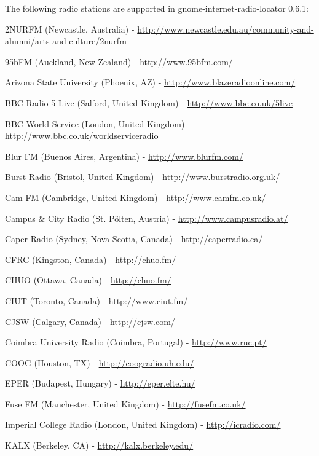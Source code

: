 \documentclass[20pt,landscape]{foils}
\begin{document}

The following radio stations are supported in gnome-internet-radio-locator 0.6.1:

\begin{list1}
\item
  \begin{list2}
  \item 2NURFM (Newcastle, Australia) - \url{http://www.newcastle.edu.au/community-and-alumni/arts-and-culture/2nurfm}
  \item 95bFM (Auckland, New Zealand) - \url{http://www.95bfm.com/}
  \item Arizona State University (Phoenix, AZ) - \url{http://www.blazeradioonline.com/}
  \item BBC Radio 5 Live (Salford, United Kingdom) - \url{http://www.bbc.co.uk/5live}
  \item BBC World Service (London, United Kingdom) - \url{http://www.bbc.co.uk/worldserviceradio}
  \item Blur FM (Buenos Aires, Argentina) - \url{http://www.blurfm.com/}
  \item Burst Radio (Bristol, United Kingdom) - \url{http://www.burstradio.org.uk/}
  \item Cam FM (Cambridge, United Kingdom) - \url{http://www.camfm.co.uk/}
  \item Campus \& City Radio (St. Pölten, Austria) - \url{http://www.campusradio.at/}
  \item Caper Radio (Sydney, Nova Scotia, Canada) - \url{http://caperradio.ca/}
  \item CFRC (Kingston, Canada) - \url{http://chuo.fm/}
  \item CHUO (Ottawa, Canada) - \url{http://chuo.fm/}
  \item CIUT (Toronto, Canada) - \url{http://www.ciut.fm/}
  \item CJSW (Calgary, Canada) - \url{http://cjsw.com/}
  \item Coimbra University Radio (Coimbra, Portugal) - \url{http://www.ruc.pt/}
  \item COOG (Houston, TX) - \url{http://coogradio.uh.edu/}
  \item EPER (Budapest, Hungary) - \url{http://eper.elte.hu/}
  \item Fuse FM (Manchester, United Kingdom) - \url{http://fusefm.co.uk/}
  \item Imperial College Radio (London, United Kingdom) - \url{http://icradio.com/}
  \item KALX (Berkeley, CA) - \url{http://kalx.berkeley.edu/}

\end{list2}
\end{list1}
\end{document}
